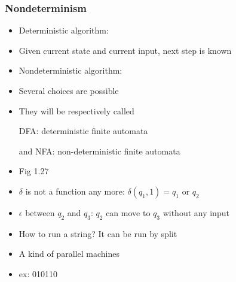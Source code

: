 




\begin{frame}[allowframebreaks] \frametitle{Nondeterminism}
  \begin{itemize}
\item Deterministic algorithm:

\item [] Given current state and current input, next step is known
\item Nondeterministic algorithm:

\item [] Several choices are possible
  
\item They will be respectively called
  \begin{center}
  DFA: deterministic finite automata
\end{center}
  and
  NFA: non-deterministic finite automata
\item Fig 1.27

\begin{center}
    \end{center}
  
  \item $\delta$ is not a function any more: $\delta(q_1, 1) = q_1
$ or $q_2$

\item $\epsilon$ between $q_2$ and $q_3$: $q_2$ can move to
$q_3$ without any input
\item How to run a string? It can be run by split

\item A kind of parallel machines
\item ex: 010110


\end{itemize}
\end{frame}
